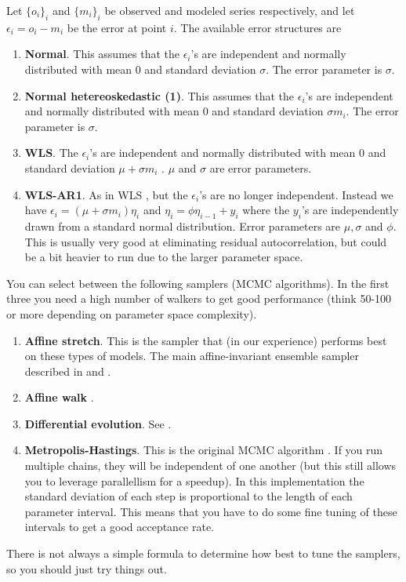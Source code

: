 \documentclass[11pt]{article}
\theoremstyle{definition}
\begin{document}
Let $\{o_i\}_i$ and $\{m_i\}_i$ be observed and modeled series respectively, and let $\epsilon_i=o_i-m_i$ be the error at point $i$. The available error structures are
\begin{enumerate}
\item {\bf Normal}. This assumes that the $\epsilon_i$'s are independent and normally distributed with mean 0 and standard deviation $\sigma$. The error parameter is $\sigma$.
\item {\bf Normal hetereoskedastic (1)}. This assumes that the $\epsilon_i$'s are independent and normally distributed with mean 0 and standard deviation $\sigma m_i$. The error parameter is $\sigma$.
\item {\bf WLS}. The $\epsilon_i$'s are independent and normally distributed with mean 0 and standard deviation $\mu + \sigma m_i$ \cite{evin-et-al14}. $\mu$ and $\sigma$ are error parameters.
\item {\bf WLS-AR1}. As in WLS \cite{evin-et-al14}, but the $\epsilon_i$'s are no longer independent. Instead we have $\epsilon_i = (\mu + \sigma m_i)\eta_i$ and $\eta_i = \phi\eta_{i-1} + y_i$ where the $y_i$'s are independently drawn from a standard normal distribution. Error parameters are $\mu, \sigma$ and $\phi$. This is usually very good at eliminating residual autocorrelation, but could be a bit heavier to run due to the larger parameter space.
\end{enumerate}

You can select between the following samplers (MCMC algorithms). In the first three you need a high number of walkers to get good performance (think 50-100 or more depending on parameter space complexity).
\begin{enumerate}
\item {\bf Affine stretch}. This is the sampler that (in our experience) performs best on these types of models. The main affine-invariant ensemble sampler described in \cite{goodman-weare10} and \cite{foreman-mackey-et-al13}.
\item {\bf Affine walk} \cite{goodman-weare10}.
\item {\bf Differential evolution}. See \cite{ter-braak06}.
\item {\bf Metropolis-Hastings}. This is the original MCMC algorithm \cite{hastings70}. If you run multiple chains, they will be independent of one another (but this still allows you to leverage parallellism for a speedup). In this implementation the standard deviation of each step is proportional to the length of each parameter interval. This means that you have to do some fine tuning of these intervals to get a good acceptance rate.
\end{enumerate}
There is not always a simple formula to determine how best to tune the samplers, so you should just try things out.
\end{document}
